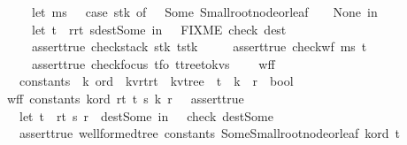 \begin{isabellebody}
\ \ \ \ let\ ms\ \ {\isacharequal}\ {\isacharparenleft}case\ stk\ of\ {\isacharbrackleft}{\isacharbrackright}\ {\isasymRightarrow}\ Some\ Small{\isacharunderscore}root{\isacharunderscore}node{\isacharunderscore}or{\isacharunderscore}leaf\ {\isacharbar}\ {\isacharunderscore}\ {\isasymRightarrow}\ None{\isacharparenright}\ in\isanewline
\ \ \ \ let\ t\ {\isacharequal}\ r{\isacharbar}{\isachargreater}r{}t\ s{\isacharbar}{\isachargreater}dest{\isacharunderscore}Some\ in\ \ {\isacharparenleft}{\isacharasterisk}\ FIXME\ check\ dest\ {\isacharasterisk}{\isacharparenright}\isanewline
\ \ \ \ assert{\isacharunderscore}true\ {\isacharparenleft}check{\isacharunderscore}stack\ stk\ t{\isacharunderscore}stk{\isacharparenright}\ {\isacharampersand}\isanewline
\ \ \ \ assert{\isacharunderscore}true\ {\isacharparenleft}check{\isacharunderscore}wf\ ms\ t{\isacharparenright}\ {\isacharampersand}\isanewline
\ \ \ \ assert{\isacharunderscore}true\ {\isacharparenleft}check{\isacharunderscore}focus\ t{\isacharunderscore}fo\ {\isacharparenleft}t{\isacharbar}{\isachargreater}tree{\isacharunderscore}to{\isacharunderscore}kvs{\isacharparenright}{\isacharparenright}\ \ \ {\isacharparenright}{\isacharparenright}{\isachardoublequoteclose}\isanewline
\isanewline
\isanewline
{}\isamarkupfalse%
\ wf{\isacharunderscore}f\ {\isacharcolon}{\isacharcolon}\ \isanewline
\ \ {\isachardoublequoteopen}constants\ {\isasymRightarrow}\ {\isacharprime}k\ ord\ {\isasymRightarrow}\ {\isacharparenleft}{\isacharprime}k{\isacharcomma}{\isacharprime}v{\isacharcomma}{\isacharprime}r{\isacharcomma}{\isacharprime}t{\isacharparenright}r{}t\ {\isasymRightarrow}\ {\isacharparenleft}{\isacharprime}k{\isacharcomma}{\isacharprime}v{\isacharparenright}tree\ {\isasymRightarrow}\ {\isacharprime}t\ {\isasymRightarrow}\ {\isacharprime}k\ {\isasymRightarrow}\ {\isacharprime}r\ {\isasymRightarrow}\ bool{\isachardoublequoteclose}\ \isanewline
{}\isanewline
{\isachardoublequoteopen}wf{\isacharunderscore}f\ constants\ k{\isacharunderscore}ord\ r{}t\ t{}\ s\ k\ r\ {\isacharequal}\ \ assert{\isacharunderscore}true\ {\isacharparenleft}\isanewline
\ \ let\ t{\isacharprime}\ {\isacharequal}\ r{}t\ s\ r\ {\isacharbar}{\isachargreater}\ dest{\isacharunderscore}Some\ in\ \ {\isacharparenleft}{\isacharasterisk}\ check\ dest{\isacharunderscore}Some\ {\isacharasterisk}{\isacharparenright}\isanewline
\ \ assert{\isacharunderscore}true\ {\isacharparenleft}wellformed{\isacharunderscore}tree\ constants\ {\isacharparenleft}Some{\isacharparenleft}Small{\isacharunderscore}root{\isacharunderscore}node{\isacharunderscore}or{\isacharunderscore}leaf{\isacharparenright}{\isacharparenright}\ k{\isacharunderscore}ord\ t{\isacharprime}{\isacharparenright}\ {\isacharampersand}\isanewline

\end{isabellebody}
